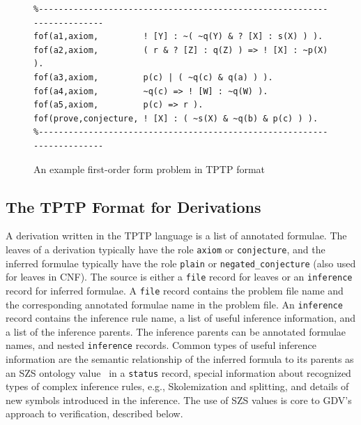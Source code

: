 \documentclass{ceurart}
\newcommand{\smalltt}[1]{\small \texttt{#1}}
\begin{document}
\begin{figure}[htb]
\centering
{\footnotesize
{\setlength{\baselineskip}{4mm}
\begin{verbatim}
%------------------------------------------------------------------------
fof(a1,axiom,         ! [Y] : ~( ~q(Y) & ? [X] : s(X) ) ).
fof(a2,axiom,         ( r & ? [Z] : q(Z) ) => ! [X] : ~p(X) ).
fof(a3,axiom,         p(c) | ( ~q(c) & q(a) ) ).
fof(a4,axiom,         ~q(c) => ! [W] : ~q(W) ).
fof(a5,axiom,         p(c) => r ).
fof(prove,conjecture, ! [X] : ( ~s(X) & ~q(b) & p(c) ) ).
%------------------------------------------------------------------------
\end{verbatim}
}}
\caption{An example first-order form problem in TPTP format}
\label{ExampleProblem}
\end{figure}

\subsection{The TPTP Format for Derivations}
\label{Derivations}

A derivation written in the TPTP language is a list of annotated formulae. 
The leaves of a derivation typically have the role \smalltt{axiom} or \smalltt{conjecture}, 
and the inferred formulae typically have the role \smalltt{plain} or \smalltt{negated\_conjecture}
(also used for leaves in CNF).
The source is either a \smalltt{file} record for leaves or an \smalltt{inference} record for 
inferred formulae.
A \smalltt{file} record contains the problem file name and the corresponding annotated formulae 
name in the problem file.
An \smalltt{inference} record contains the inference rule name, a list of useful inference 
information, and a list of the inference parents.
The inference parents can be annotated formulae names, and nested \smalltt{inference} records.
Common types of useful inference information are the semantic relationship of the inferred formula 
to its parents as an SZS ontology value~\cite{Sut08-KEAPPA} in a \smalltt{status} record, 
special information about recognized types of complex inference rules, e.g., Skolemization and
splitting, and details of new symbols introduced in the inference.
The use of SZS values is core to GDV's approach to verification, described below.
\end{document}
